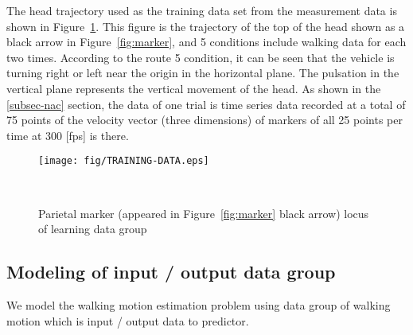 \documentclass{sigchi}
\begin{document}
The head trajectory used as the training data set from the measurement data is shown in Figure~\ref{fig:training-data}. This figure is the trajectory of the top of the head shown as a black arrow in Figure~\ref{fig:marker}, and 5 conditions include walking data for each two times. According to the route 5 condition, it can be seen that the vehicle is turning right or left near the origin in the horizontal plane. The pulsation in the vertical plane represents the vertical movement of the head. As shown in the \ref{subsec-nac} section, the data of one trial is time series data recorded at a total of 75 points of the velocity vector (three dimensions) of markers of all 25 points per time at 300 [fps] is there.




\begin{figure}
\centering
  \texttt{[image: fig/TRAINING-DATA.eps]}
  \caption{Parietal marker (appeared in Figure~\ref{fig:marker} black arrow) locus of learning data group}~ 
    \label{fig:training-data}
\end{figure}


\subsection{Modeling of input / output data group}
\label{projection}

We model the walking motion estimation problem using data group of walking motion which is input / output data to predictor.
\end{document}
